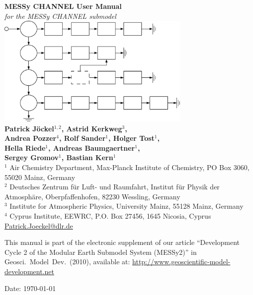 \documentclass[twoside]{article}
\begin{document}
\thispagestyle{empty}
\begin{center}
  {\Huge\bf MESSy CHANNEL User Manual}\\[3mm]
  {\huge\it for the MESSy CHANNEL submodel}\\[9mm]
  {\includegraphics[width=0.7\textwidth]{channel_logo}}\\[9mm]
  {\huge\bf Patrick J\"ockel$^{1,2}$, Astrid Kerkweg{$^3$},}\\[3mm]
  {\huge\bf Andrea Pozzer$^4$, Rolf Sander$^1$, Holger Tost$^1$,}\\[3mm]
  {\huge\bf Hella Riede$^1$, Andreas Baumgaertner$^1$,}\\[3mm]
  {\huge\bf Sergey Gromov$^1$, Bastian Kern$^1$}\\[9mm]
  \Large
  $^1$ Air Chemistry Department, Max-Planck Institute of Chemistry,
       PO Box 3060, 55020 Mainz, Germany\\
  $^2$ Deutsches Zentrum f\"{u}r Luft- und Raumfahrt, Institut
       f\"{u}r Physik der Atmosph\"{a}re, Oberpfaffenhofen, 82230 Wessling,
       Germany\\
  $^3$ Institute for Atmospheric Physics, University Mainz, 55128 Mainz,
       Germany\\
  $^4$ Cyprus Institute, EEWRC, P.O. Box 27456, 1645 Nicosia, Cyprus\\
  \url{Patrick.Joeckel@dlr.de}

\end{center}

\vfill

{\large This manual is part of the electronic supplement of our article
``Development Cycle 2 of the Modular Earth Submodel System (MESSy2)''
  in Geosci.\ Model\ Dev.\
  (2010), available at: \url{http://www.geoscientific-model-development.net}}

\begin{center}
  Date: \today
\end{center}
\end{document}

